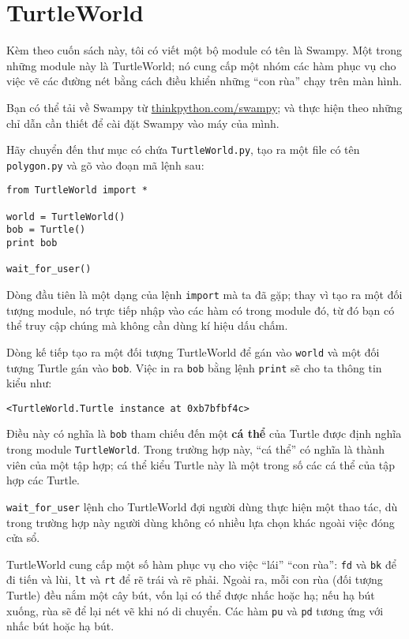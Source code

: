 \documentclass[11pt]{book}
\begin{document}
\section{TurtleWorld}

Kèm theo cuốn sách này, tôi có viết một bộ module có tên là 
Swampy.  Một trong những module này là TurtleWorld; nó cung cấp
một nhóm các hàm phục vụ cho việc vẽ các đường nét bằng cách
điều khiển những ``con rùa'' chạy trên màn hình.

Bạn có thể tải về Swampy từ \url{thinkpython.com/swampy};
và thực hiện theo những chỉ dẫn cần thiết để cài đặt Swampy 
vào máy của mình.

Hãy chuyển đến thư mục có chứa {\tt TurtleWorld.py}, tạo ra một
file có tên {\tt polygon.py} và gõ vào đoạn mã lệnh sau:

\beforeverb
\begin{verbatim}
from TurtleWorld import *

world = TurtleWorld()
bob = Turtle()
print bob

wait_for_user()
\end{verbatim}
\afterverb
%
Dòng đầu tiên là một dạng của lệnh {\tt import} mà ta đã gặp;
thay vì tạo ra một đối tượng module, nó trực tiếp nhập vào các
hàm có trong module đó, từ đó bạn có thể truy cập chúng mà không
cần dùng kí hiệu dấu chấm.


Dòng kế tiếp tạo ra một đối tượng TurtleWorld để gán vào {\tt world} và
một đối tượng Turtle gán vào {\tt bob}. Việc in ra {\tt bob} bằng lệnh
{\tt print} sẽ cho ta thông tin kiểu như:

\beforeverb
\begin{verbatim}
<TurtleWorld.Turtle instance at 0xb7bfbf4c>
\end{verbatim}
\afterverb
%
Điều này có nghĩa là {\tt bob} tham chiếu đến một
{\bf cá thể} của Turtle được định nghĩa trong module
{\tt TurtleWorld}.  Trong trường hợp này,
``cá thể'' có nghĩa là thành viên của một tập hợp;
cá thể kiểu Turtle này là một trong số các cá thể của
tập hợp các Turtle.


\verb"wait_for_user"  lệnh cho TurtleWorld đợi người dùng
thực hiện một thao tác, dù trong trường hợp này người dùng
không có nhiều lựa chọn khác ngoài việc đóng cửa sổ.

TurtleWorld cung cấp một số hàm phục vụ cho việc ``lái'' 
``con rùa'': {\tt fd} và {\tt bk} để đi tiến và lùi, 
{\tt lt} và {\tt rt} để rẽ trái và rẽ phải.
Ngoài ra, mỗi con rùa (đối tượng Turtle) đều nắm một cây bút,
vốn lại có thể được nhấc hoặc hạ; nếu hạ bút xuống, rùa sẽ để lại
nét vẽ khi nó di chuyển. Các hàm {\tt pu} và {\tt pd}
tương ứng với nhấc bút hoặc hạ bút. 
\end{document}
